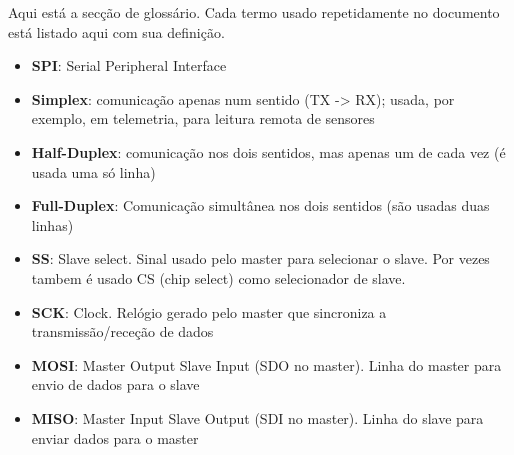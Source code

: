 \documentclass[a4paper, 12pt, onecolumn, twoside]{article}
\begin{document}
Aqui está a secção de glossário. Cada termo usado repetidamente no documento está listado aqui com sua definição.

\begin{itemize}
    \item\label{spi} \textbf{SPI}: Serial Peripheral Interface
    \item\label{simplex} \textbf{Simplex}: comunicação apenas num sentido (TX -> RX); usada, por
    exemplo, em telemetria, para leitura remota de sensores
    \item\label{halfduplex} \textbf{Half-Duplex}: comunicação nos dois sentidos, mas apenas um de
    cada vez (é usada uma só linha)
    \item\label{fullduplex} \textbf{Full-Duplex}: Comunicação simultânea nos dois sentidos (são
    usadas duas linhas)
    \item\label{ss} \textbf{SS}: Slave select. Sinal usado pelo master para selecionar o slave. Por vezes
    tambem é usado CS (chip select) como selecionador de slave.
    \item\label{sck} \textbf{SCK}: Clock. Relógio gerado pelo master que sincroniza a transmissão/receção de dados
    \item\label{mosi} \textbf{MOSI}: Master Output Slave Input (SDO no master).
    Linha do master para envio de dados para o slave
    \item\label{miso} \textbf{MISO}: Master Input Slave Output (SDI no master).
    Linha do slave para enviar dados para o master
\end{itemize}
\end{document}
